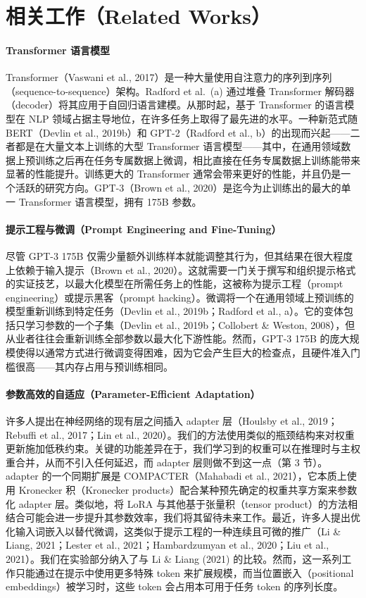 \documentclass[11pt,UTF8,fontset=fandol]{ctexart}
\begin{document}
\section{相关工作（Related Works）}

\paragraph{Transformer 语言模型}Transformer（Vaswani et al., 2017）是一种大量使用自注意力的序列到序列（sequence-to-sequence）架构。Radford et al.\ (a) 通过堆叠 Transformer 解码器（decoder）将其应用于自回归语言建模。从那时起，基于 Transformer 的语言模型在 NLP 领域占据主导地位，在许多任务上取得了最先进的水平。一种新范式随 BERT（Devlin et al., 2019b）和 GPT-2（Radford et al., b）的出现而兴起——二者都是在大量文本上训练的大型 Transformer 语言模型——其中，在通用领域数据上预训练之后再在任务专属数据上微调，相比直接在任务专属数据上训练能带来显著的性能提升。训练更大的 Transformer 通常会带来更好的性能，并且仍是一个活跃的研究方向。GPT-3（Brown et al., 2020）是迄今为止训练出的最大的单一 Transformer 语言模型，拥有 175B 参数。

\paragraph{提示工程与微调（Prompt Engineering and Fine-Tuning）}尽管 GPT-3 175B 仅需少量额外训练样本就能调整其行为，但其结果在很大程度上依赖于输入提示（Brown et al., 2020）。这就需要一门关于撰写和组织提示格式的实证技艺，以最大化模型在所需任务上的性能，这被称为提示工程（prompt engineering）或提示黑客（prompt hacking）。微调将一个在通用领域上预训练的模型重新训练到特定任务（Devlin et al., 2019b；Radford et al., a）。它的变体包括只学习参数的一个子集（Devlin et al., 2019b；Collobert \& Weston, 2008），但从业者往往会重新训练全部参数以最大化下游性能。然而，GPT-3 175B 的庞大规模使得以通常方式进行微调变得困难，因为它会产生巨大的检查点，且硬件准入门槛很高——其内存占用与预训练相同。

\paragraph{参数高效的自适应（Parameter-Efficient Adaptation）}许多人提出在神经网络的现有层之间插入 adapter 层（Houlsby et al., 2019；Rebuffi et al., 2017；Lin et al., 2020）。我们的方法使用类似的瓶颈结构来对权重更新施加低秩约束。关键的功能差异在于，我们学习到的权重可以在推理时与主权重合并，从而不引入任何延迟，而 adapter 层则做不到这一点（第 3 节）。adapter 的一个同期扩展是 COMPACTER（Mahabadi et al., 2021），它本质上使用 Kronecker 积（Kronecker products）配合某种预先确定的权重共享方案来参数化 adapter 层。类似地，将 LoRA 与其他基于张量积（tensor product）的方法相结合可能会进一步提升其参数效率，我们将其留待未来工作。最近，许多人提出优化输入词嵌入以替代微调，这类似于提示工程的一种连续且可微的推广（Li \& Liang, 2021；Lester et al., 2021；Hambardzumyan et al., 2020；Liu et al., 2021）。我们在实验部分纳入了与 Li \& Liang (2021) 的比较。然而，这一系列工作只能通过在提示中使用更多特殊 token 来扩展规模，而当位置嵌入（positional embeddings）被学习时，这些 token 会占用本可用于任务 token 的序列长度。
\end{document}
